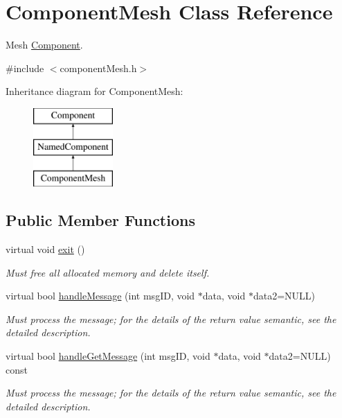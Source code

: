 \hypertarget{classComponentMesh}{
\section{\-Component\-Mesh \-Class \-Reference}
\label{de/d34/classComponentMesh}
}


\-Mesh \hyperlink{classComponent}{\-Component}.  




{\ttfamily \#include $<$component\-Mesh.\-h$>$}

\-Inheritance diagram for \-Component\-Mesh\-:\begin{figure}[H]
\begin{center}
\leavevmode
\includegraphics[height=3.000000cm]{de/d34/classComponentMesh}
\end{center}
\end{figure}
\subsection*{\-Public \-Member \-Functions}
\begin{DoxyCompactItemize}
\item 
\hypertarget{classComponentMesh_aa1592d479a961a82bf85ce7cca7a5919}{
virtual void \hyperlink{classComponentMesh_aa1592d479a961a82bf85ce7cca7a5919}{exit} ()}
\label{de/d34/classComponentMesh_aa1592d479a961a82bf85ce7cca7a5919}

\begin{DoxyCompactList}\small\item\em \-Must free all allocated memory and delete itself. \end{DoxyCompactList}\item 
virtual bool \hyperlink{classComponentMesh_af96a8a4f56dca6233cf173890d5d928f}{handle\-Message} (int msg\-I\-D, void $\ast$data, void $\ast$data2=\-N\-U\-L\-L)
\begin{DoxyCompactList}\small\item\em \-Must process the message; for the details of the return value semantic, see the detailed description. \end{DoxyCompactList}\item 
virtual bool \hyperlink{classComponentMesh_a6a1f699ac12e969283ef9b71670e91c2}{handle\-Get\-Message} (int msg\-I\-D, void $\ast$data, void $\ast$data2=\-N\-U\-L\-L) const 
\begin{DoxyCompactList}\small\item\em \-Must process the message; for the details of the return value semantic, see the detailed description. \end{DoxyCompactList}\end{DoxyCompactItemize}
